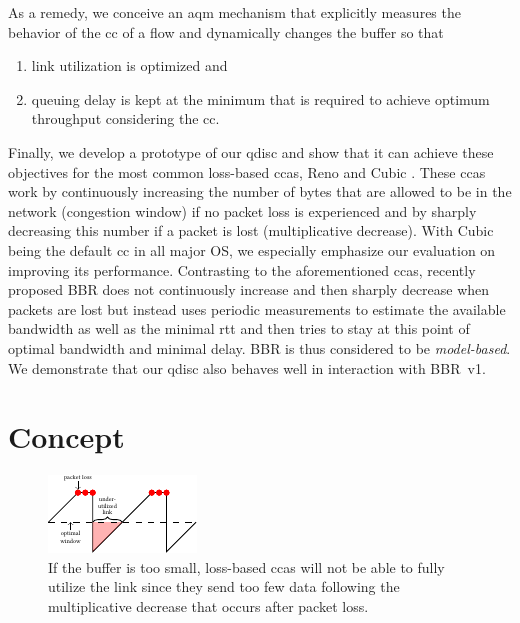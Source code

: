 \documentclass[10pt,sigconf,letterpaper,dvipsnames\ifx\removeHeaders\tempYes ,nonacm\fi\ifx\removeHeaders\tempNo ,anonymous\fi]{acmart}
\begin{document}
As a remedy, we conceive an \gls{aqm} mechanism that explicitly measures the behavior of the \gls{cc} of a flow and dynamically changes the buffer so that 
\begin{enumerate}[topsep=0pt,wide,labelwidth=!,labelindent=0pt]
\item link utilization is optimized and
\item queuing delay is kept at the minimum that is required to achieve optimum throughput considering the \gls{cc}.
\end{enumerate}
Finally, we develop a prototype of our \gls{qdisc} and show that it can achieve these objectives for the most common loss-based \glspl{cca}, Reno \cite {jacobson_congestion_1988} and Cubic \cite{ha_cubic:_2008}. These \glspl{cca} work by continuously increasing the number of bytes that are allowed to be in the network (congestion window) if no packet loss is experienced and by sharply decreasing this number if a packet is lost (multiplicative decrease). With Cubic being the default \gls{cc} in all major OS, we especially emphasize our evaluation on improving its performance. Contrasting to the aforementioned \glspl{cca}, recently proposed BBR \cite{cardwell_bbr:_2016} does not continuously increase and then sharply decrease when packets are lost but instead uses periodic measurements to estimate the available bandwidth as well as the minimal \gls{rtt} and then tries to stay at this point of optimal bandwidth and minimal delay. BBR is thus considered to be \textit{model-based}. We demonstrate that our \gls{qdisc} also behaves well in interaction with BBR~v1.

\section{Concept}

\begin{figure}[h]
\includegraphics[width=\columnwidth]{figures/traq_illustration_too_little.pdf}
\caption{If the buffer is too small, loss-based \glspl{cca} will not be able to fully utilize the link since they send too few data following the multiplicative decrease that occurs after packet loss.}
\label{fig:tooLittle}
\end{figure}
\end{document}
